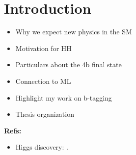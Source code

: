 \chapter{Introduction}

\begin{itemize}
	\item Why we expect new physics in the SM
	\item Motivation for HH
	\item Particulars about the 4b final state
	\item Connection to ML
	\item Highlight my work on b-tagging
	\item Thesis organization
\end{itemize}


\textbf{Refs: }
\begin{itemize}
\item Higgs discovery:  \cite{HIGG-2012-27, CMS-HIG-12-028}.
\end{itemize}